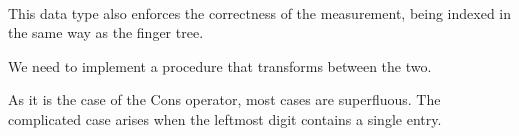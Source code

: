 \documentclass[12pt,twoside,notitlepage]{report}
\begin{document}
\begin{code}
\\
\\
\>  \AgdaSymbol{\{}\AgdaSymbol{\}(} \AgdaSymbol{:}  \AgdaSymbol{)(} \AgdaSymbol{:}  \AgdaSymbol{)}\<%
\\
\>[8]\<[10]%
\>[10]  \AgdaSymbol{:}   \<%
\\
\>[8]\<[10]%
\>[10]  \AgdaSymbol{:}     \AgdaSymbol{:}\<%
\\
\>[8]\<[10]%
\>[10]\AgdaSymbol{\{} \AgdaSymbol{:} \AgdaSymbol{\}}    \<%
\\
\>[0]\<[2]%
\>[2] \AgdaSymbol{:} \<[10]%
\>[10]   \AgdaSymbol{\{}\AgdaSymbol{\}}\<%
\\
\>[0]\<[2]%
\>[2] \AgdaSymbol{:}  \AgdaSymbol{\{}\AgdaSymbol{\}}\<%
\\
\>[2]\<[10]%
\>[10]\AgdaSymbol{(} \AgdaSymbol{:} \AgdaSymbol{)}\<%
\\
\>[2]\<[10]%
\>[10] \AgdaSymbol{(} \AgdaSymbol{:}    \AgdaSymbol{\{}\AgdaSymbol{\})}\<%
\\
\>[2]\<[10]%
\>[10]    \AgdaSymbol{\{}    \AgdaSymbol{\}}\<%
\\
\end{code} 

This data type also enforces the correctness of the measurement, being indexed in the same way as the finger tree. 

We need to implement a procedure that transforms between the two.

As it is the case of the Cons operator, most cases are superfluous. The complicated case arises when the leftmost digit contains a single entry.
\end{document}
